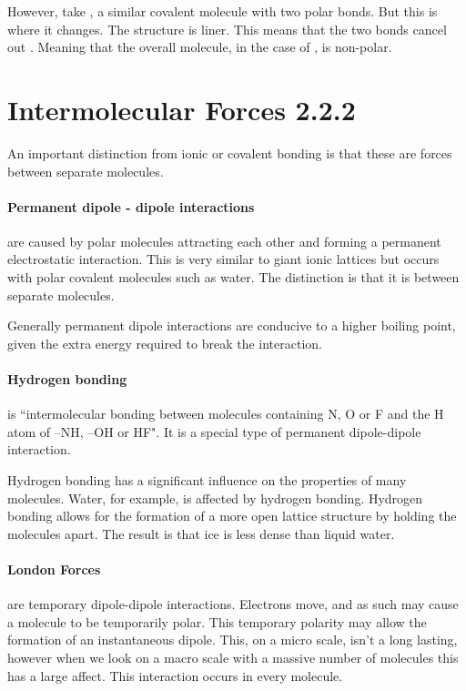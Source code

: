 	However, take , a similar covalent molecule with two  polar bonds.
	But this is where it changes. The structure is liner.
	This means that the two bonds cancel out .
	Meaning that the overall molecule, in the case of , is non-polar.
	
\section{Intermolecular Forces 2.2.2}
An important distinction from ionic or covalent bonding is that these are forces between separate molecules.

	\paragraph{Permanent dipole - dipole interactions} are caused by polar molecules attracting each other and forming a permanent electrostatic interaction.
	This is very similar to giant ionic lattices but occurs with polar covalent molecules such as water.
	The distinction is that it is between separate molecules.
	
	Generally permanent dipole interactions are conducive to a higher boiling point, given the extra energy required to break the interaction.
	
	\paragraph{Hydrogen bonding} is ``intermolecular bonding between molecules containing N, O or F and the H atom of –NH, –OH or HF". It is a special type of permanent dipole-dipole interaction. 
	
	Hydrogen bonding has a significant influence on the properties of many molecules.
	Water, for example, is affected by hydrogen bonding.
	Hydrogen bonding allows for the formation of a more open lattice structure by holding the molecules apart.
	The result is that ice is less dense than liquid water.
	
	\paragraph{London Forces} are temporary dipole-dipole interactions.
	Electrons move, and as such may cause a molecule to be temporarily polar.
	This temporary polarity may allow the formation of an instantaneous dipole.
	This, on a micro scale, isn't a long lasting, however when we look on a macro scale with a massive number of molecules this has a large affect.
	This interaction occurs in every molecule.
	
